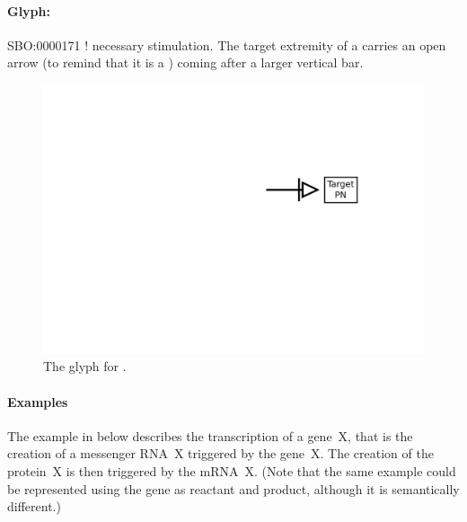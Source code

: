 \paragraph{Glyph: }\label{sec:techref:necessary_stim}


\begin{glyphDescription}
 \glyphSboTerm SBO:0000171 ! necessary stimulation.
 \glyphNode The target extremity of a  carries an open arrow (to remind that it is a ) coming after a larger vertical bar.
 \end{glyphDescription}

\begin{figure}[htb]
  \centering
  \includegraphics[scale = 0.5]{images/necessary_stim}
  \caption{The \PD glyph for .}
  \label{fig:techref:Necessary Stimulation}
\end{figure}

\paragraph{Examples}

The example in  below describes the
transcription of a gene~X, that is the creation of a messenger RNA~X
triggered by the gene~X.  The creation of the protein~X is then
triggered by the mRNA~X.  (Note that the same example could be
represented using the gene as reactant and product, although it is
semantically different.)

